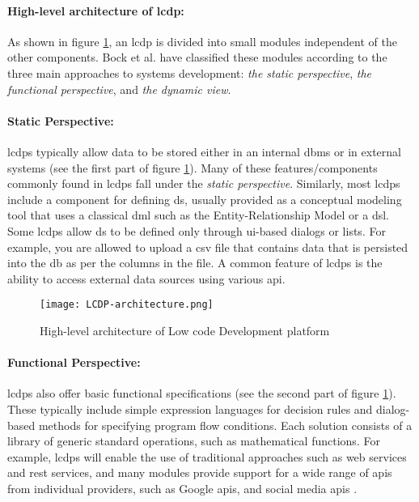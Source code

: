 \paragraph*{High-level architecture of \ac{lcdp}:}
As shown in figure \ref{fig:background:architecture}, an \ac{lcdp} is divided into small modules independent of the other components.
Bock et al. \cite{misc:lowcode:platforms} have classified these modules according to the three main approaches to systems development: \textit{the static perspective}, \textit{the functional perspective}, and \textit{the dynamic view}.
\paragraph*{Static Perspective:}
\ac{lcdp}s typically allow data to be stored either in an internal \ac{dbms} or in external systems (see the first part of figure \ref{fig:background:architecture}). 
Many of these features/components commonly found in \ac{lcdp}s fall under the \textit{static perspective}. 
Similarly, most \ac{lcdp}s include a component for defining \ac{ds}, usually provided as a conceptual modeling tool that uses a classical \ac{dml} such as the Entity-Relationship Model or a \ac{dsl}. 
Some \ac{lcdp}s allow \ac{ds} to be defined only through \ac{ui}-based dialogs or lists.
For example, you are allowed to upload a \ac{csv} file that contains data that is persisted into the \ac{db} as per the columns in the file.
A common feature of \ac{lcdp}s is the ability to access external data sources using various \ac{api}.
\begin{figure}[htbp!]
  \centering
  \texttt{[image: LCDP-architecture.png]}
  \caption[LCDP architecture]{High-level architecture of Low code Development platform}
  \label{fig:background:architecture}
\end{figure}
\paragraph*{Functional Perspective:}
\ac{lcdp}s also offer basic functional specifications (see the second part of figure \ref{fig:background:architecture}). 
These typically include simple expression languages for decision rules and dialog-based methods for specifying program flow conditions. 
Each solution consists of a library of generic standard operations, such as mathematical functions. 
For example, \ac{lcdp}s will enable the use of traditional approaches such as web services and \ac{rest} services, and many modules provide support for a wide range of \ac{api}s from individual providers, such as Google \ac{api}s, and social media \ac{api}s \cite{misc:lowcode:platforms}.
